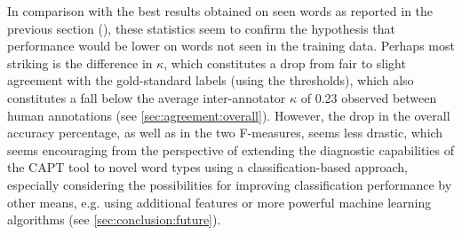 	
	
	
	In comparison with the best results obtained on seen words as reported in the previous section (), these statistics seem to confirm the hypothesis that performance would be lower on words not seen in the training data. Perhaps most striking is the difference in $\kappa$, which constitutes a drop from fair to slight agreement with the gold-standard labels (using the \textcite{Landis1977} thresholds), which also constitutes a fall below the average inter-annotator $\kappa$ of 0.23 observed between human annotations (see \cref{sec:agreement:overall}). However, the drop in the overall accuracy percentage, as well as in the two F-measures, seems less drastic, which seems encouraging from the perspective of extending the diagnostic capabilities of the CAPT tool to novel word types using a classification-based approach, especially considering the possibilities for improving classification performance by other means, e.g. using additional features or more powerful machine learning algorithms (see \cref{sec:conclusion:future}).
	
	
		
		
	

	
	

		
		

	
	






	
	
	
	 
